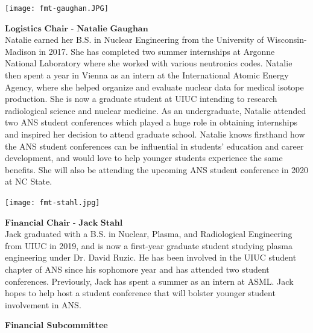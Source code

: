 \begin{minipage}{0.25\textwidth}
	\centering
	\texttt{[image: fmt-gaughan.JPG]}
\end{minipage}
\begin{minipage}{0.73\textwidth}
$\textbf{Logistics Chair - Natalie Gaughan}$\\
	Natalie earned her B.S. in Nuclear Engineering from the University of Wisconsin-Madison in 2017. She has completed two summer internships at Argonne National Laboratory where she worked with various neutronics codes. Natalie then spent a year in Vienna as an intern at the International Atomic Energy Agency, where she helped organize and evaluate nuclear data for medical isotope production. She is now a graduate student at UIUC intending to research radiological science and nuclear medicine. As an undergraduate, Natalie attended two ANS student conferences which played a huge role in obtaining internships and inspired her decision to attend graduate school. Natalie knows firsthand how the ANS student conferences can be influential in students’ education and career development, and would love to help younger students experience the same benefits. She will also be attending the upcoming ANS student conference in 2020 at NC State.
\end{minipage}

\begin{minipage}{0.25\textwidth}
	\centering
	\texttt{[image: fmt-stahl.jpg]}
\end{minipage}
\begin{minipage}{0.73\textwidth}
	$\textbf{Financial Chair - Jack Stahl}$\\
Jack graduated with a B.S. in Nuclear, Plasma, and Radiological Engineering from UIUC in 2019, and is now a first-year graduate student studying plasma engineering under Dr. David Ruzic. He has been involved in the UIUC student chapter of ANS since his sophomore year and has attended two student conferences. Previously, Jack has spent a summer as an intern at ASML. Jack hopes to help host a student conference that will bolster younger student involvement in ANS.
\end{minipage}

\clearpage
\textbf{Financial Subcommittee}\\

